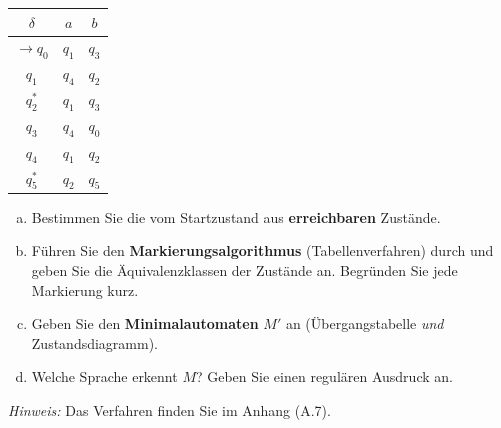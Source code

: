 \begin{center}
\begin{tabular}{c|cc}
  $\delta$ & $a$ & $b$ \\
  \hline
  $\to q_0$ & $q_1$ & $q_3$ \\
  $q_1$ & $q_4$ & $q_2$ \\
  $q_2^*$ & $q_1$ & $q_3$ \\
  $q_3$ & $q_4$ & $q_0$ \\
  $q_4$ & $q_1$ & $q_2$ \\
  $q_5^*$ & $q_2$ & $q_5$ \\
\end{tabular}
\end{center}

\begin{enumerate}[a)]
  \item Bestimmen Sie die vom Startzustand aus \textbf{erreichbaren} Zustände.
  \item Führen Sie den \textbf{Markierungsalgorithmus} (Tabellenverfahren) durch und geben Sie die Äquivalenzklassen der Zustände an. Begründen Sie jede Markierung kurz.
  \item Geben Sie den \textbf{Minimalautomaten} $M'$ an (Übergangstabelle \emph{und} Zustandsdiagramm).
  \item Welche Sprache erkennt $M$? Geben Sie einen regulären Ausdruck an.
\end{enumerate}
\textit{Hinweis:} Das Verfahren finden Sie im Anhang (A.7).

